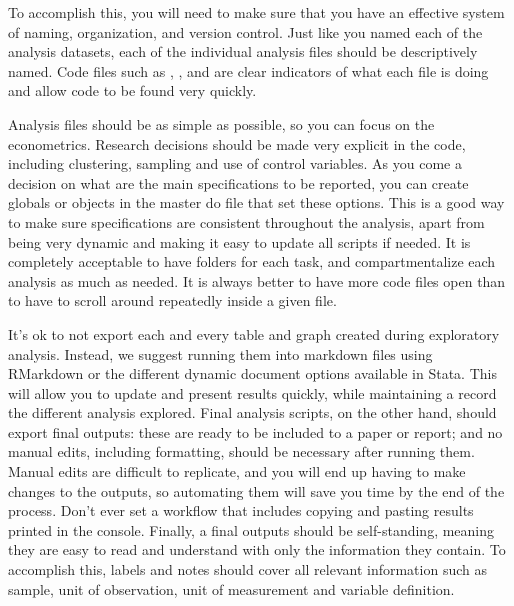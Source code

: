 To accomplish this, you will need to make sure that you
have an effective system of naming, organization, and version control.
Just like you named each of the analysis datasets,
each of the individual analysis files should be descriptively named.
Code files such as ,
, and 
are clear indicators of what each file is doing
and allow code to be found very quickly.

Analysis files should be as simple as possible, 
so you can focus on the econometrics.
Research decisions should be made very explicit in the code, 
including clustering, sampling and use of control variables. 
As you come a decision on what are the main specifications to be reported,
you can create globals or objects in the master do file 
that set these options.
This is a good way to make sure specifications are consistent throughout the analysis, 
apart from being very dynamic and making it easy to update all scripts if needed.
It is completely acceptable to have folders for each task,
and compartmentalize each analysis as much as needed.
It is always better to have more code files open
than to have to scroll around repeatedly inside a given file.


It's ok to not export each and every table and graph created during exploratory analysis. 
Instead, we suggest running them into markdown files using RMarkdown or 
the different dynamic document options available in Stata. 
This will allow you to update and present results quickly, 
while maintaining a record the different analysis explored. 
Final analysis scripts, on the other hand, should export final outputs: 
these are ready to be included to a paper or report; and
no manual edits, including formatting, should be necessary after running them. 
Manual edits are difficult to replicate, 
and you will end up having to make changes to the outputs,
so automating them will save you time by the end of the process. 
Don't ever set a workflow that includes copying and pasting results printed in the console.
Finally, a final outputs should be self-standing,
meaning they are easy to read and understand 
with only the information they contain.
To accomplish this, labels and notes should cover all 
relevant information such as
sample, unit of observation, unit of measurement and variable definition. 

